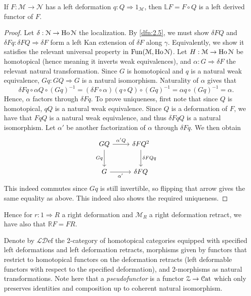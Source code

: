 \begin{theorem}\label{thm:2.1}
	If $F : \mathcal{M}  \to \mathcal{N} $ has a left deformation $q : Q \Rightarrow 1_\mathcal{M} $, then $\mathbb{L} F=F\circ Q$ is a left derived functor of $F$.
\end{theorem}
\begin{proof}
	Let $\delta : \mathcal{N}  \to \operatorname{Ho} \mathcal{N} $ the localization. By \cref{dfn:2.5}, we must show $\delta FQ$ and $\delta Fq : \delta FQ \Rightarrow \delta F$ form a left Kan extension of $\delta F$ along $\gamma$. Equivalently, we show it satisfies the relevant universal property in $\operatorname{Fun}(\mathcal{M} ,\operatorname{Ho}\mathcal{N} )$. Let $H : \mathcal{M}  \to \operatorname{Ho} \mathcal{N} $ be homotopical (hence meaning it inverts weak equivalences), and $\alpha : G \Rightarrow \delta F$ the relevant natural transformation. Since $G$ is homotopical and $q$ is a natural weak equivalence, $Gq : GQ \Rightarrow G$ is a natural isomorphism. Naturality of $\alpha$ gives that
	\[
		\delta Fq\circ \alpha Q\circ (Gq)^{-1} =(\delta F\circ \alpha)(q\circ Q)\circ (Gq)^{-1} =\alpha q \circ (Gq)^{-1} =\alpha
	.\]
	Hence, $\alpha$ factors through $\delta Fq$. To prove uniqueness, first note that since $Q$ is homotopical, $qQ$ is a natural weak equivalence. Since $Q$ is a deformation of $F$, we have that $FqQ$ is a natural weak equivalence, and thus $\delta FqQ$ is a natural isomorphism. Let $\alpha'$ be another factorization of $\alpha$ through $\delta Fq$. We then obtain
	\[\begin{tikzcd}[row sep = 2.5em, column sep = 2.5em]
	GQ \ar[" \alpha' Q", r] \ar[" Gq "', d]  & \delta FQ^2 \ar[" \delta FQq ", d]  \\
	G\ar[" \alpha' "', r]  & \delta FQ
	\end{tikzcd}\]
	This indeed commutes since $Gq$ is still invertible, so flipping that arrow gives the same equality as above. This indeed also shows the required uniqueness.
\end{proof}

Hence for $r : 1 \Rightarrow R$ a right deformation and $\mathcal{M} _R$ a right deformation retract, we have also that $\mathbb{R} F=FR$.

Denote by $\mathcal{L} \mathcal{D} \mathrm{ef} $ the 2-category of homotopical categories equipped with specified left deformations and left deformation retracts, morphisms given by functors that restrict to homotopical functors on the deformation retracts (left deformable functors with respect to the specified deformation), and 2-morphisms as natural transformations. Note here that a \emph{pseudofunctor} is a functor $\mathcal{Z} \to \mathcal{C}\mathrm{at} $ which only preserves identities and composition up to coherent natural isomorphism.

